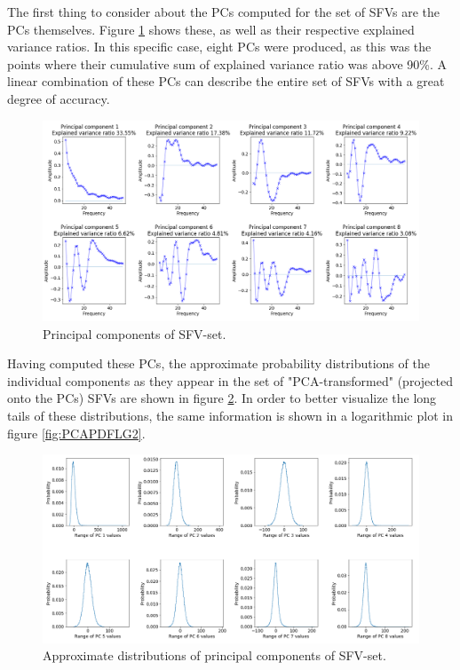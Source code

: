 \documentclass{kththesis}
\begin{document}
The first thing to consider about the PCs computed for the set of SFVs are the PCs themselves.
Figure \ref{fig:PCS} shows these, as well as their respective explained variance ratios. 
In this specific case, eight PCs were produced, as this was the points where their cumulative sum of explained variance ratio was above 90\%.
A linear combination of these PCs can describe the entire set of SFVs with a great degree of accuracy.

\begin{figure}[H]
    \centering
    \centerline{\includegraphics[width=1.2\textwidth]{images/PCA/PCS.png}}
    \caption{Principal components of SFV-set.}
    \label{fig:PCS}
\end{figure}

Having computed these PCs, the approximate probability distributions of the individual components as they appear in the set of "PCA-transformed" (projected onto the PCs) SFVs are shown in figure \ref{fig:PCAPDF}. 
In order to better visualize the long tails of these distributions, the same information is shown in a logarithmic plot in figure \ref{fig:PCAPDFLG2}.

\begin{figure}[H]
    \centering
    \centerline{\includegraphics[width=1.2\textwidth]{images/PCA/PCAPDF.png}}
    \caption{Approximate distributions of principal components of SFV-set.}
    \label{fig:PCAPDF}
\end{figure}
\end{document}
